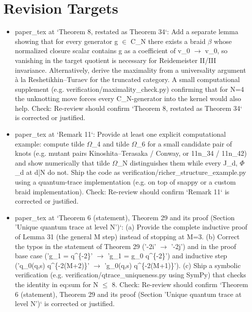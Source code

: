 \documentclass[11pt]{article}
\begin{document}
\section*{Revision Targets}
\begin{itemize}[leftmargin=*]
  \item [open] paper\_tex at `Theorem 8, restated as Theorem 34`: Add a separate lemma showing that for every generator g \ensuremath{\in} C\_N there exists a braid \ensuremath{\beta} whose normalized closure scalar contains g as a coefficient of v\_0 \ensuremath{\to} v\_0, so vanishing in the target quotient is necessary for Reidemeister II/III invariance. Alternatively, derive the maximality from a universality argument à la Reshetikhin--Turaev for the truncated category. A small computational supplement (e.g. verification/maximality\_check.py) confirming that for N=4 the unknotting move forces every C\_N-generator into the kernel would also help. Check: Re-review should confirm `Theorem 8, restated as Theorem 34` is corrected or justified.
  \item [open] paper\_tex at `Remark 11`: Provide at least one explicit computational example: compute tilde \ensuremath{\Omega}\_4 and tilde \ensuremath{\Omega}\_6 for a small candidate pair of knots (e.g. mutant pairs Kinoshita--Terasaka / Conway, or 11n\_34 / 11n\_42) and show numerically that tilde \ensuremath{\Omega}\_N distinguishes them while every J\_d, \ensuremath{\Phi}\_d at d|N do not. Ship the code as verification/richer\_structure\_example.py using a quantum-trace implementation (e.g. on top of snappy or a custom braid implementation). Check: Re-review should confirm `Remark 11` is corrected or justified.
  \item [open] paper\_tex at `Theorem 6 (statement), Theorem 29 and its proof (Section 'Unique quantum trace at level N')`: (a) Provide the complete inductive proof of Lemma 31 (the general M step) instead of stopping at M=3. (b) Correct the typos in the statement of Theorem 29 ('-2i' \ensuremath{\to} '-2j') and in the proof base case ('g\_1 = q\^{}\{-2\}' \ensuremath{\to} 'g\_1 = g\_0 q\^{}\{-2\}') and inductive step ('q\_0(q,s) q\^{}\{-2(M+2)\}' \ensuremath{\to} 'g\_0(q,s) q\^{}\{-2(M+1)\}'). (c) Ship a symbolic verification (e.g. verification/qtrace\_uniqueness.py using SymPy) that checks the identity in eq:sum for N \ensuremath{\le} 8. Check: Re-review should confirm `Theorem 6 (statement), Theorem 29 and its proof (Section 'Unique quantum trace at level N')` is corrected or justified.

\end{itemize}
\end{document}
